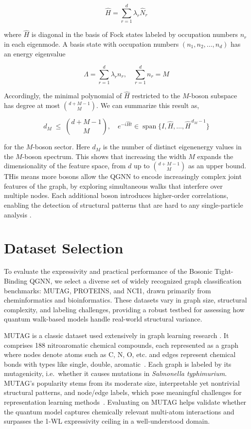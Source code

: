 \documentclass[11pt]{article}
\begin{document}
$$
\widehat{H}=\sum_{r=1}^d \lambda_r \widehat{N}_r
$$

where $\widehat{H}$ is diagonal in the basis of Fock states labeled by occupation numbers $n_r$ in each eigenmode. A basis state with occupation numbers $(n_1,n_2,\dots,n_d)$ has an energy eigenvalue

$$
\Lambda=\sum_{r=1}^d \lambda_r n_r, \quad \sum_{r=1}^d n_r=M
$$

Accordingly, the minimal polynomial of $\widehat{H}$ restricted to the $M$-boson subspace has degree at most $\binom{d+M-1}{M}$. We can summarize this result as,

$$
d_M \;\le\; \binom{d+M-1}{M}, \quad e^{-i\widehat H t}\in \operatorname{span}\{I,\widehat H,\dots,\widehat H^{\,d_M-1}\}
$$

for the $M$-boson sector. Here $d_M$ is the number of distinct eigenenergy values in the $M$-boson spectrum. This shows that increasing the width $M$  expands the dimensionality of the feature space, from $d$ up to $\binom{d+M-1}{M}$ as an upper bound. THis means more bosons allow the QGNN to encode increasingly complex joint features of the graph, by exploring simultaneous walks that interfere over multiple nodes. Each additional boson introduces higher-order correlations, enabling the detection of structural patterns that are hard to any single-particle analysis \citep{hong1987hom,aaronson2011bosonsampling}.

\section{Dataset Selection}

To evaluate the expressivity and practical performance of the Bosonic Tight-Binding QGNN, we select a diverse set of widely recognized graph classification benchmarks: MUTAG, PROTEINS, and NCI1, drawn primarily from cheminformatics and bioinformatics. These datasets vary in graph size, structural complexity, and labeling challenges, providing a robust testbed for assessing how quantum walk-based models handle real-world structural variance.

MUTAG is a classic dataset used extensively in graph learning research \citep{debnath1991mutag}. It comprises 188 nitroaromatic chemical compounds, each represented as a graph where nodes denote atoms such as C, N, O, etc. and edges represent chemical bonds with types like single, double, aromatic~. Each graph is labeled by its mutagenicity, i.e.\ whether it causes mutations in \emph{Salmonella typhimurium}. MUTAG’s popularity stems from its moderate size, interpretable yet nontrivial structural patterns, and node/edge labels, which pose meaningful challenges for representation learning methods~. Evaluating on MUTAG helps validate whether the quantum model captures chemically relevant multi-atom interactions and surpasses the 1-WL expressivity ceiling in a well-understood domain.
\end{document}
